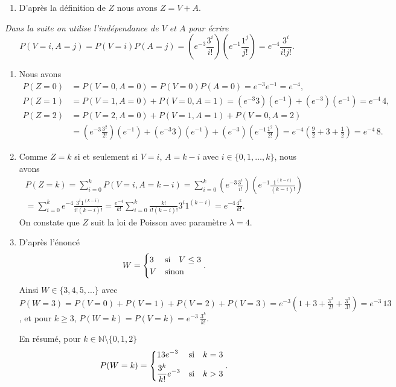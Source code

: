 \documentclass[12pt,reqno]{amsart}
\begin{document}
\begin{solution}
  \begin{enumerate}
    \item D'après la définition de $Z$ nous avons $Z = V + A$.
  \end{enumerate}
  \emph{Dans la suite on utilise l'indépendance de $V$ et $A$ pour écrire
    $$
      P(V=i, A=j) = P(V=i)P(A=j) = (e^{-3}\frac{3^{i}}{i!})(e^{-1}\frac{1^{j}}{j!}) = e^{-4}\frac{3^{i}}{i!j!}.
    $$}
  \begin{enumerate}[resume]
    \item Nous avons
    \begin{align*}
      P(Z=0) &= P(V=0, A=0) = P(V=0)P(A=0) = e^{-3}e^{-1}=e^{-4},\\
      P(Z=1) &= P(V=1, A=0) + P(V=0, A=1) = (e^{-3}3)(e^{-1})+(e^{-3})(e^{-1})=e^{-4}\,4,\\
      P(Z=2) &= P(V=2, A=0) + P(V=1, A=1) + P(V=0, A=2)\\
             &= (e^{-3}\frac{3^{2}}{2!})(e^{-1})+(e^{-3}3)(e^{-1})+(e^{-3})(e^{-1}\frac{1^{2}}{2!})=e^{-4}(\frac{9}{2}+3+\frac{1}{2})=e^{-4}\,8.
    \end{align*}
    \item Comme $Z=k$ si et seulement si $V=i$, $A=k-i$ avec $i \in \{0,1,\ldots,k\}$, nous avons
    \begin{multline*}
      P(Z=k) = \sum_{i=0}^k P(V=i, A=k-i)
        = \sum_{i=0}^k \left(e^{-3}\frac{3^{i}}{i!}\right)\left(e^{-1}\frac{1^{(k-i)}}{(k-i)!}\right) \\
        = \sum_{i=0}^k e^{-4}\frac{3^{i}1^{(k-i)}}{i!(k-i)!}
        = \frac{e^{-4}}{k!} \sum_{i=0}^k \frac{k!}{i!(k-i)!}3^{i}1^{(k-i)} = e^{-4}\frac{4^k}{k!}.
    \end{multline*}
    On constate que $Z$ suit la loi de Poisson avec paramètre $\lambda = 4$.
    \item D'après l'énoncé
    $$
      W = \begin{cases}
        3 & \text{si\quad} V \leq 3\\
        V & \text{sinon}
      \end{cases}.
    $$
    Ainsi $W \in \{3,4,5,\ldots\}$ avec $P(W=3) = P(V=0)+P(V=1)+P(V=2)+P(V=3) = e^{-3}\left( 1+3+\frac{3^{2}}{2!} + \frac{3^{3}}{3!}\right) = e^{-3}\,13$, et pour $k \geq 3$, $P(W=k) = P(V=k) = e^{-3}\,\frac{3^{k}}{k!}$.

    En résumé, pour $k \in \mathbb{N}\setminus \{0,1,2\}$
    $$
      P(W=k) =
        \begin{dcases}
                        13e^{-3} & \text{si\quad} k = 3\\
          \frac{3^{k}}{k!}e^{-3} & \text{si\quad} k > 3
        \end{dcases}.
    $$
  \end{enumerate}
\end{solution}
\end{document}

